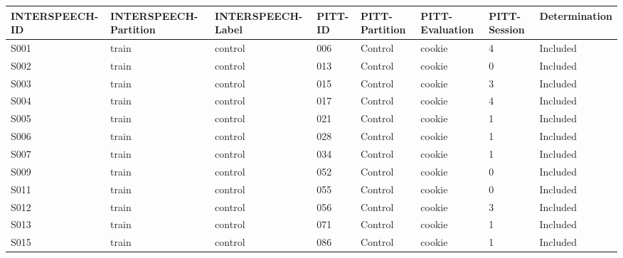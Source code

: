 \begin{center}
\tiny
\begin{longtable}{|l|l|l|l|l|l|l|l|}
\hline
INTERSPEECH-ID & INTERSPEECH-Partition & INTERSPEECH-Label & PITT-ID & PITT-Partition & PITT-Evaluation & PITT-Session & Determination \\ \hline
S001           & train                 & control           & 006     & Control        & cookie          & 4            & Included      \\ \hline
S002           & train                 & control           & 013     & Control        & cookie          & 0            & Included      \\ \hline
S003           & train                 & control           & 015     & Control        & cookie          & 3            & Included      \\ \hline
S004           & train                 & control           & 017     & Control        & cookie          & 4            & Included      \\ \hline
S005           & train                 & control           & 021     & Control        & cookie          & 1            & Included      \\ \hline
S006           & train                 & control           & 028     & Control        & cookie          & 1            & Included      \\ \hline
S007           & train                 & control           & 034     & Control        & cookie          & 1            & Included      \\ \hline
S009           & train                 & control           & 052     & Control        & cookie          & 0            & Included      \\ \hline
S011           & train                 & control           & 055     & Control        & cookie          & 0            & Included      \\ \hline
S012           & train                 & control           & 056     & Control        & cookie          & 3            & Included      \\ \hline
S013           & train                 & control           & 071     & Control        & cookie          & 1            & Included      \\ \hline
S015           & train                 & control           & 086     & Control        & cookie          & 1            & Included      \\ \hline

\end{longtable}
\end{center}
